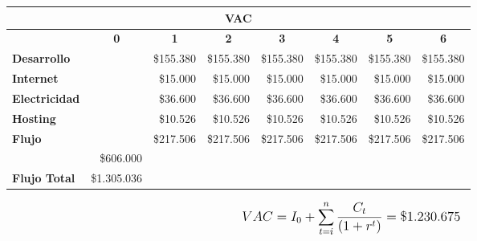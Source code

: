 \begin{center}
	\begin{tabular}{ | l | l | l | l | l | l | l | l |}
		\hline
		\multicolumn{8}{|c|}{\textbf{VAC}} \\
		\hline
		& \multicolumn{1}{|c|}{\textbf{0}} & \multicolumn{1}{|c|}{\textbf{1}} & \multicolumn{1}{|c|}{\textbf{2}} & \multicolumn{1}{|c|}{\textbf{3}} & \multicolumn{1}{|c|}{\textbf{4}} & \multicolumn{1}{|c|}{\textbf{5}} & \multicolumn{1}{|c|}{\textbf{6}} \\
		\hline
		{\textbf{Desarrollo}} &  & \multicolumn{1}{|r|}{\$155.380} & \multicolumn{1}{|r|}{\$155.380} & \multicolumn{1}{|r|}{\$155.380} & \multicolumn{1}{|r|}{\$155.380} & \multicolumn{1}{|r|}{\$155.380} & \multicolumn{1}{|r|}{\$155.380} \\ \hline
		
		{\textbf{Internet}} &  & \multicolumn{1}{|r|}{\$15.000} & \multicolumn{1}{|r|}{\$15.000} & \multicolumn{1}{|r|}{\$15.000} & \multicolumn{1}{|r|}{\$15.000} & \multicolumn{1}{|r|}{\$15.000} & \multicolumn{1}{|r|}{\$15.000} \\ \hline
		
		{\textbf{Electricidad}} &  & \multicolumn{1}{|r|}{\$36.600} & \multicolumn{1}{|r|}{\$36.600} & \multicolumn{1}{|r|}{\$36.600} & \multicolumn{1}{|r|}{\$36.600} & \multicolumn{1}{|r|}{\$36.600} & \multicolumn{1}{|r|}{\$36.600} \\ \hline
		
		{\textbf{Hosting}} &  & \multicolumn{1}{|r|}{\$10.526} & \multicolumn{1}{|r|}{\$10.526} & \multicolumn{1}{|r|}{\$10.526} & \multicolumn{1}{|r|}{\$10.526} & \multicolumn{1}{|r|}{\$10.526} & \multicolumn{1}{|r|}{\$10.526} \\ \hline
		
		{\textbf{Flujo}} &  & \multicolumn{1}{|r|}{\$217.506} & \multicolumn{1}{|r|}{\$217.506} & \multicolumn{1}{|r|}{\$217.506} & \multicolumn{1}{|r|}{\$217.506} & \multicolumn{1}{|r|}{\$217.506} & \multicolumn{1}{|r|}{\$217.506} \\ \hline
		& \multicolumn{1}{|r|}{\$606.000} & & & & & & \\ \hline
		\textbf{Flujo Total} & \multicolumn{1}{|r|}{\$1.305.036} & & & & & & \\ \hline
	\end{tabular}
\end{center}

\[
\mathlarger{
	{VAC} = I_0 + \sum\limits_{t=i}^{n}\frac{C_t}{\left(1+r^t\right)} = \$1.230.675
}
\]

